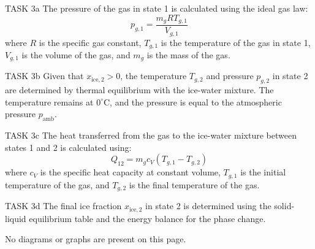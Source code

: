 TASK 3a  
The pressure of the gas in state 1 is calculated using the ideal gas law:  
\[
p_{g,1} = \frac{m_g R T_{g,1}}{V_{g,1}}
\]  
where \( R \) is the specific gas constant, \( T_{g,1} \) is the temperature of the gas in state 1, \( V_{g,1} \) is the volume of the gas, and \( m_g \) is the mass of the gas.  

TASK 3b  
Given that \( x_{\text{ice},2} > 0 \), the temperature \( T_{g,2} \) and pressure \( p_{g,2} \) in state 2 are determined by thermal equilibrium with the ice-water mixture. The temperature remains at \( 0^\circ\text{C} \), and the pressure is equal to the atmospheric pressure \( p_{\text{amb}} \).  

TASK 3c  
The heat transferred from the gas to the ice-water mixture between states 1 and 2 is calculated using:  
\[
Q_{12} = m_g c_V (T_{g,1} - T_{g,2})
\]  
where \( c_V \) is the specific heat capacity at constant volume, \( T_{g,1} \) is the initial temperature of the gas, and \( T_{g,2} \) is the final temperature of the gas.  

TASK 3d  
The final ice fraction \( x_{\text{ice},2} \) in state 2 is determined using the solid-liquid equilibrium table and the energy balance for the phase change.  

No diagrams or graphs are present on this page.